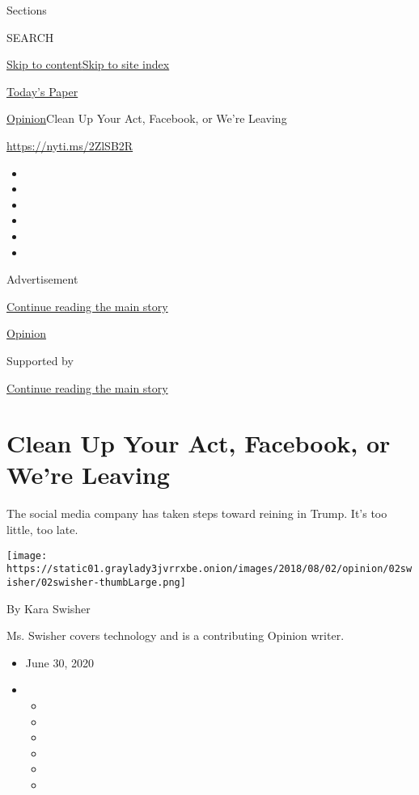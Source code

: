 Sections

SEARCH

\protect\hyperlink{site-content}{Skip to
content}\protect\hyperlink{site-index}{Skip to site index}

\href{https://myaccount.nytimes3xbfgragh.onion/auth/login?response_type=cookie\&client_id=vi}{}

\href{https://www.nytimes3xbfgragh.onion/section/todayspaper}{Today's
Paper}

\href{/section/opinion}{Opinion}\textbar{}Clean Up Your Act, Facebook,
or We're Leaving

\url{https://nyti.ms/2ZlSB2R}

\begin{itemize}
\item
\item
\item
\item
\item
\item
\end{itemize}

Advertisement

\protect\hyperlink{after-top}{Continue reading the main story}

\href{/section/opinion}{Opinion}

Supported by

\protect\hyperlink{after-sponsor}{Continue reading the main story}

\hypertarget{clean-up-your-act-facebook-or-were-leaving}{%
\section{Clean Up Your Act, Facebook, or We're
Leaving}\label{clean-up-your-act-facebook-or-were-leaving}}

The social media company has taken steps toward reining in Trump. It's
too little, too late.

\texttt{[image: https://static01.graylady3jvrrxbe.onion/images/2018/08/02/opinion/02swisher/02swisher-thumbLarge.png]}

By Kara Swisher

Ms. Swisher covers technology and is a contributing Opinion writer.

\begin{itemize}
\item
  June 30, 2020
\item
  \begin{itemize}
  \item
  \item
  \item
  \item
  \item
  \item
  \end{itemize}
\end{itemize}


